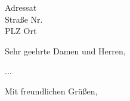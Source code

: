 \documentclass[
	fsphys,
	a4paper,
	12pt,
	pagesize,
	ngerman
]{scrlttr2}
\begin{document}
\begin{letter}{Adressat\\Straße Nr.\\PLZ Ort}

\opening{Sehr geehrte Damen und Herren,}

...

\closing{Mit freundlichen Grüßen,}




\end{letter}
\end{document}
